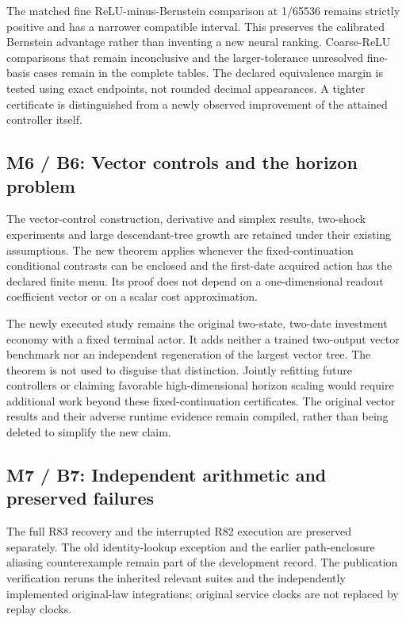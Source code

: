 The matched fine ReLU-minus-Bernstein comparison at 1/65536 remains
strictly positive and has a narrower compatible interval. This preserves
the calibrated Bernstein advantage rather than inventing a new neural
ranking. Coarse-ReLU comparisons that remain inconclusive and the
larger-tolerance unresolved fine-basis cases remain in the complete
tables. The declared equivalence margin is tested using exact endpoints,
not rounded decimal appearances. A tighter certificate is distinguished
from a newly observed improvement of the attained controller itself.

\hypertarget{m6-b6-vector-controls-and-the-horizon-problem}{%
\subsection{M6 / B6: Vector controls and the horizon
problem}\label{m6-b6-vector-controls-and-the-horizon-problem}}

The vector-control construction, derivative and simplex results,
two-shock experiments and large descendant-tree growth are retained
under their existing assumptions. The new theorem applies whenever the
fixed-continuation conditional contrasts can be enclosed and the
first-date acquired action has the declared finite menu. Its proof does
not depend on a one-dimensional readout coefficient vector or on a
scalar cost approximation.

The newly executed study remains the original two-state, two-date
investment economy with a fixed terminal actor. It adds neither a
trained two-output vector benchmark nor an independent regeneration of
the largest vector tree. The theorem is not used to disguise that
distinction. Jointly refitting future controllers or claiming favorable
high-dimensional horizon scaling would require additional work beyond
these fixed-continuation certificates. The original vector results and
their adverse runtime evidence remain compiled, rather than being
deleted to simplify the new claim.

\hypertarget{m7-b7-independent-arithmetic-and-preserved-failures}{%
\subsection{M7 / B7: Independent arithmetic and preserved
failures}\label{m7-b7-independent-arithmetic-and-preserved-failures}}

The full R83 recovery and the interrupted R82 execution are preserved
separately. The old identity-lookup exception and the earlier
path-enclosure aliasing counterexample remain part of the development
record. The publication verification reruns the inherited relevant
suites and the independently implemented original-law integrations;
original service clocks are not replaced by replay clocks.

